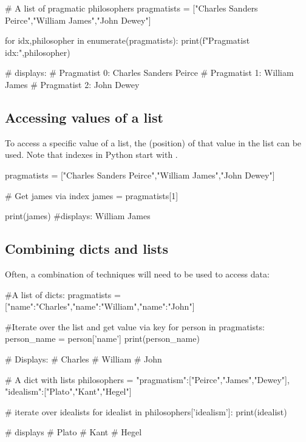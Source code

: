 \begin{pycode}
    # A list of pragmatic philosophers
    pragmatists = ["Charles Sanders Peirce","William James","John Dewey"]

    for idx,philosopher in enumerate(pragmatists):
        print(f"Pragmatist {idx}:",philosopher)

    # displays:
    # Pragmatist 0: Charles Sanders Peirce
    # Pragmatist 1: William James
    # Pragmatist 2: John Dewey
\end{pycode}

\subsection{Accessing values of a list}

To access a specific value of a list, the  (position) of that value in the list can be used. Note that indexes in Python start with .

\begin{pycode}
    pragmatists = ["Charles Sanders Peirce","William James","John Dewey"]

    # Get james via index
    james = pragmatists[1]

    print(james) #displays: William James
\end{pycode}

\subsection{Combining dicts and lists}

Often, a combination of techniques will need to be used to access data:

\begin{pycode}
    #A list of dicts:
    pragmatists = [{"name":"Charles"},{"name":"William"},{"name":"John"}]

    #Iterate over the list and get value via key
    for person in pragmatists:
        person_name = person['name']
        print(person_name)

    # Displays:
    # Charles
    # William
    # John
\end{pycode}

\begin{pycode}
    # A dict with lists
    philosophers = {
        "pragmatism":["Peirce","James","Dewey"],
        "idealism":["Plato","Kant","Hegel"]
    }

    # iterate over idealists
    for idealist in philosophers['idealism']:
        print(idealist)

    # displays
    # Plato
    # Kant
    # Hegel

\end{pycode}

